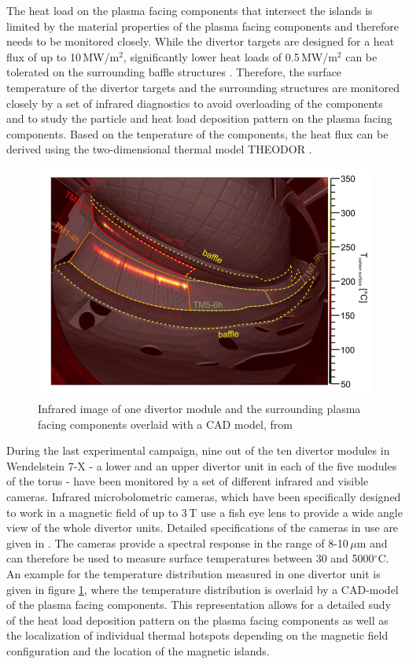 The heat load on the plasma facing components that intersect the islands is limited by the material properties of the plasma facing components and therefore needs to be monitored closely. While the divertor targets are designed for a heat flux of up to 10\,MW/m$^2$, significantly lower heat loads of 0.5\,MW/m$^2$ can be tolerated on the surrounding baffle structures \cite{Jakubowski2018}. Therefore, the surface temperature of the divertor targets and the surrounding structures are monitored closely by a set of infrared diagnostics to avoid overloading of the components and to study the particle and heat load deposition pattern on the plasma facing components. Based on the tenperature of the components, the heat flux can be derived using the two-dimensional thermal model THEODOR \cite{Sieglin2015}.
\begin{figure}[!htb]
    \centering
    \includegraphics[scale = 0.5]{images/ir_image.png}
    \caption{Infrared image of one divertor module and the surrounding plasma facing components overlaid with a CAD model, from \cite{Jakubowski2018}} \label{fig:2}
\end{figure}
During the last experimental campaign, nine out of the ten divertor modules in Wendelstein 7-X - a lower and an upper divertor unit in each of the five modules of the torus - have been monitored by a set of different infrared and visible cameras. Infrared microbolometric cameras, which have been specifically designed to work in a magnetic field of up to 3\,T use a fish eye lens to provide a wide angle view of the whole divertor units. Detailed specifications of the cameras in use are given in \cite{Jakubowski2018}. The cameras provide a spectral response in the range of 8-10\,$\mu$m and can therefore be used to measure surface temperatures between 30 and 5000$^\circ$C. An example for the temperature distribution measured in one divertor unit is given in figure \ref{fig:2}, where the temperature distribution is overlaid by a CAD-model of the plasma facing components. This representation allows for a detailed sudy of the heat load deposition pattern on the plasma facing components \cite{Niemann2020} as well as the localization of individual thermal hotspots depending on the magnetic field configuration and the location of the magnetic islands.





